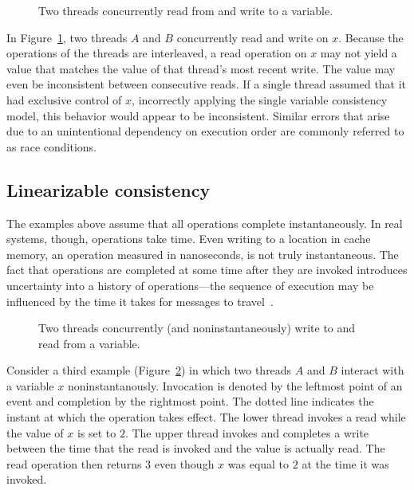 \documentclass{sig-alternate}
\begin{document}
\begin{figure}[ht]
  \centering
  \resizebox{0.85\linewidth}{!}{}
  \caption{Two threads concurrently read from and write to a variable.}
\label{figure:multiple}
\end{figure}

In Figure~\ref{figure:multiple}, two threads $A$ and $B$ concurrently read and write on $x$. Because the operations of the threads are interleaved, a read operation on $x$ may not yield a value that matches the value of that thread's most recent write. The value may even be inconsistent between consecutive reads. If a single thread assumed that it had exclusive control of $x$, incorrectly applying the single variable consistency model, this behavior would appear to be inconsistent. Similar errors that arise due to an unintentional dependency on execution order are commonly referred to as race conditions.

\subsection{Linearizable consistency}

The examples above assume that all operations complete instantaneously. In real systems, though, operations take time. Even writing to a location in cache memory, an operation measured in nanoseconds, is not truly instantaneous. The fact that operations are completed at some time after they are invoked introduces uncertainty into a history of operations---the sequence of execution may be influenced by the time it takes for messages to travel~\cite{Kingsbury2014}.

\begin{figure}[ht]
  \centering
  \resizebox{0.8\linewidth}{!}{}
  \caption{Two threads concurrently (and noninstantaneously) write to and read from a variable.}
\label{figure:time}
\end{figure}

Consider a third example (Figure~\ref{figure:time}) in which two threads $A$ and $B$ interact with a variable $x$ noninstantanously. Invocation is denoted by the leftmost point of an event and completion by the rightmost point. The dotted line indicates the instant at which the operation takes effect. The lower thread invokes a read while the value of $x$ is set to $2$. The upper thread invokes and completes a write between the time that the read is invoked and the value is actually read. The read operation then returns $3$ even though $x$ was equal to $2$ at the time it was invoked.
\end{document}
